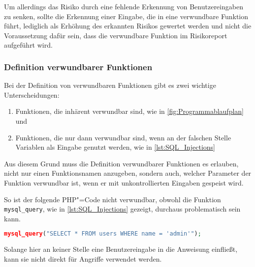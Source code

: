                 Um allerdings das Risiko durch eine fehlende Erkennung von Benutzereingaben zu senken,
                sollte die Erkennung einer Eingabe,
                die in eine verwundbare Funktion führt,
                lediglich als Erhöhung des erkannten Risikos gewertet werden und
                nicht die Voraussetzung dafür sein,
                dass die verwundbare Funktion im Risikoreport aufgeführt wird.

            \subsubsection{Definition verwundbarer Funktionen}
                Bei der Definition von verwundbaren Funktionen gibt es zwei wichtige Unterscheidungen:

                \begin{enumerate}
                    \item Funktionen,
                      die inhärent verwundbar sind,
                      wie in
                      \vref{fig:Programmablaufplan} und
                    \item Funktionen,
                      die nur dann verwundbar sind,
                      wenn an der falschen Stelle Variablen als Eingabe genutzt werden,
                      wie in
                      \vref{lst:SQL_Injections}
                \end{enumerate}

                Aus diesem Grund muss die Definition verwundbarer Funktionen es erlauben,
                nicht nur einen Funktionsnamen anzugeben,
                sondern auch,
                welcher Parameter der Funktion verwundbar ist,
                wenn er mit unkontrollierten Eingaben gespeist wird.

                So ist der folgende
                \gls{PHP}"=Code nicht verwundbar,
                obwohl die Funktion
                \lstinline{mysql_query},
                wie in
                \vref{lst:SQL_Injections} gezeigt,
                durchaus problematisch sein kann.

                \begin{lstlisting}[caption={Nicht verwundbare Nutzung von \lstinline{mysql_query}}, gobble=20, language=php]
                    mysql_query("SELECT * FROM users WHERE name = 'admin'");
                \end{lstlisting}

                Solange hier an keiner Stelle eine Benutzereingabe in die Anweisung einfließt,
                kann sie nicht direkt für Angriffe verwendet werden.

